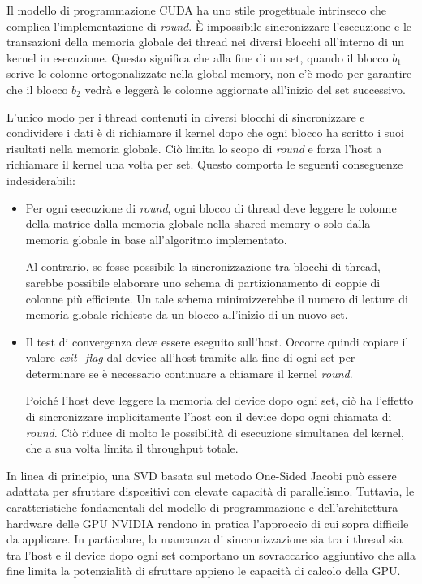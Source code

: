\label{sec:Conclusioni}
Il modello di programmazione CUDA ha uno stile progettuale intrinseco che complica l'implementazione di \textit{round}. È impossibile sincronizzare l'esecuzione e le transazioni della memoria globale dei thread nei diversi blocchi all'interno di un kernel in esecuzione. Questo significa che alla fine di un set, quando il blocco $b_1$ scrive le colonne ortogonalizzate nella global memory, non c'è modo per garantire che il blocco $b_2$ vedrà e leggerà le colonne aggiornate all'inizio del set successivo.

L'unico modo per i thread contenuti in diversi blocchi di sincronizzare e condividere i dati è di richiamare il kernel dopo che ogni blocco ha scritto i suoi risultati nella memoria globale. Ciò limita lo scopo di \textit{round} e forza l'host a richiamare il kernel una volta per set. Questo comporta le seguenti conseguenze indesiderabili:
\begin{itemize}
	\item Per ogni esecuzione di \textit{round}, ogni blocco di thread deve leggere le colonne della matrice dalla memoria globale nella shared memory o solo dalla memoria globale in base all'algoritmo implementato.
	
	
	Al contrario, se fosse possibile la sincronizzazione tra blocchi di thread, sarebbe possibile elaborare uno schema di partizionamento di coppie di colonne più efficiente. Un tale schema minimizzerebbe il numero di letture di memoria globale richieste da un blocco all'inizio di un nuovo set.
	
	\item Il test di convergenza deve essere eseguito sull'host. Occorre quindi copiare il valore \textit{exit\_flag} dal device all'host tramite  alla fine di ogni set per determinare se è necessario continuare a chiamare il kernel \textit{round}. 
	
	Poiché l'host deve leggere la memoria del device dopo ogni set, ciò ha l'effetto di sincronizzare implicitamente l'host con il device dopo ogni chiamata di \textit{round}. Ciò riduce di molto le possibilità di esecuzione simultanea del kernel, che a sua volta limita il throughput totale.
\end{itemize}
In linea di principio, una SVD basata sul metodo One-Sided Jacobi può essere adattata per sfruttare dispositivi con elevate capacità di parallelismo. Tuttavia, le caratteristiche fondamentali del modello di programmazione e dell'architettura hardware delle GPU NVIDIA rendono in pratica l'approccio di cui sopra difficile da applicare. In particolare, la mancanza di sincronizzazione sia tra i thread sia tra l'host e il device dopo ogni set comportano un sovraccarico aggiuntivo che alla fine limita la potenzialità di sfruttare appieno le capacità di calcolo della GPU.\cite{Romer:SVD}


